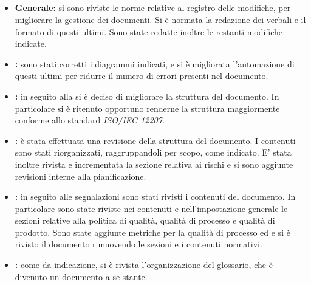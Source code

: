 \documentclass[12pt,a4paper]{article}
\begin{document}
	\subsection{\RR{}}
	\begin{itemize}
		\item \textbf{Generale:} si sono riviste le norme relative al registro delle modifiche, per migliorare la gestione dei documenti. Si è normata la redazione dei verbali e il formato di questi ultimi. Sono state redatte inoltre le restanti modifiche indicate.
		\item \textbf{\AdR{}:} sono stati corretti i diagrammi indicati, e si è migliorata l'automazione di questi ultimi per ridurre il numero di errori presenti nel documento.
		\item \textbf{\NdP{}:} in seguito alla \RR{} si è deciso di migliorare la struttura del documento. In particolare si è ritenuto opportuno renderne la struttura maggiormente conforme allo standard \textit{ISO/IEC 12207}.
		\item \textbf{\PdP{}:} è stata effettuata una revisione della struttura del documento. I contenuti sono stati riorganizzati, raggruppandoli per scopo, come indicato. E' stata inoltre rivista e incrementata la sezione relativa ai rischi e si sono aggiunte revisioni interne alla pianificazione.
		\item \textbf{\PdQ{}:} in seguito alle segnalazioni sono stati rivisti i contenuti del documento. In particolare sono state riviste nei contenuti e nell'impostazione generale le sezioni relative alla politica di qualità, qualità di processo e qualità di prodotto. Sono state aggiunte metriche per la qualità di processo ed e si è rivisto il documento rimuovendo le sezioni e i contenuti normativi.
		\item \textbf{\GL{}:} come da indicazione, si è rivista l'organizzazione del glossario, che è divenuto un documento a se stante.
	\end{itemize}
	
\end{document}
